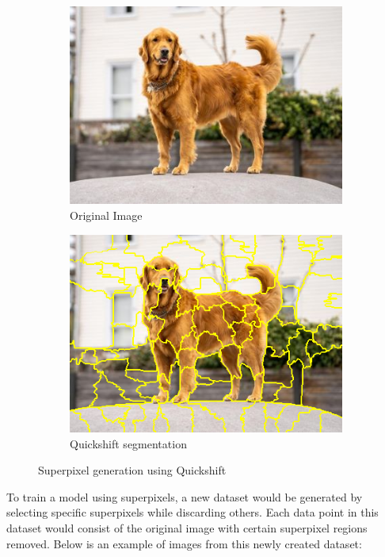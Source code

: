 \newpage

\begin{figure}
    \captionsetup{justification=centering}

    \begin{subfigure}[t]{0.48\textwidth}
        \captionsetup{justification=centering}
        \centering
        \includegraphics[width=.7\linewidth]{figuras/lime/dog.jpg}
        \caption{Original Image}
    \end{subfigure}
    \hfill
    \begin{subfigure}[t]{0.48\textwidth}
        \captionsetup{justification=centering}
        \centering
        \includegraphics[width=.7\linewidth]{figuras/lime/segmentation_dog.png}
        \caption{Quickshift segmentation}
    \end{subfigure}
    \caption{Superpixel generation using Quickshift}
    \label{fig:superpixel_quickshift}
\end{figure}

To train a model using superpixels, a new dataset would be generated by selecting specific superpixels while discarding others. 
Each data point in this dataset would consist of the original image with certain superpixel regions removed. 
Below is an example of images from this newly created dataset:

